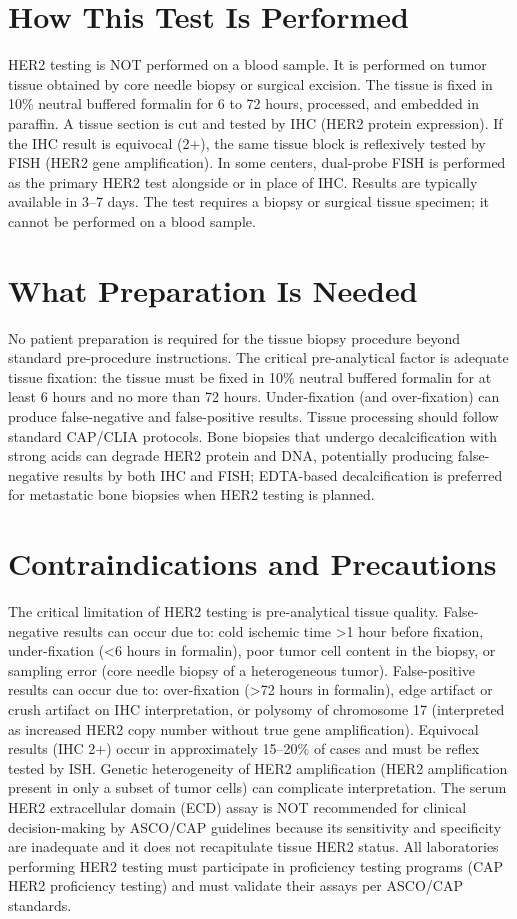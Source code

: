 \section*{How This Test Is Performed}
HER2 testing is NOT performed on a blood sample. It is performed on tumor tissue obtained by core needle biopsy or surgical excision. The tissue is fixed in 10\% neutral buffered formalin for 6 to 72 hours, processed, and embedded in paraffin. A tissue section is cut and tested by IHC (HER2 protein expression). If the IHC result is equivocal (2+), the same tissue block is reflexively tested by FISH (HER2 gene amplification). In some centers, dual-probe FISH is performed as the primary HER2 test alongside or in place of IHC. Results are typically available in 3--7 days. The test requires a biopsy or surgical tissue specimen; it cannot be performed on a blood sample.

\section*{What Preparation Is Needed}
No patient preparation is required for the tissue biopsy procedure beyond standard pre-procedure instructions. The critical pre-analytical factor is adequate tissue fixation: the tissue must be fixed in 10\% neutral buffered formalin for at least 6 hours and no more than 72 hours. Under-fixation (and over-fixation) can produce false-negative and false-positive results. Tissue processing should follow standard CAP/CLIA protocols. Bone biopsies that undergo decalcification with strong acids can degrade HER2 protein and DNA, potentially producing false-negative results by both IHC and FISH; EDTA-based decalcification is preferred for metastatic bone biopsies when HER2 testing is planned.

\section*{Contraindications and Precautions}
The critical limitation of HER2 testing is pre-analytical tissue quality. False-negative results can occur due to: cold ischemic time >1 hour before fixation, under-fixation (<6 hours in formalin), poor tumor cell content in the biopsy, or sampling error (core needle biopsy of a heterogeneous tumor). False-positive results can occur due to: over-fixation (>72 hours in formalin), edge artifact or crush artifact on IHC interpretation, or polysomy of chromosome 17 (interpreted as increased HER2 copy number without true gene amplification). Equivocal results (IHC 2+) occur in approximately 15--20\% of cases and must be reflex tested by ISH. Genetic heterogeneity of HER2 amplification (HER2 amplification present in only a subset of tumor cells) can complicate interpretation. The serum HER2 extracellular domain (ECD) assay is NOT recommended for clinical decision-making by ASCO/CAP guidelines because its sensitivity and specificity are inadequate and it does not recapitulate tissue HER2 status. All laboratories performing HER2 testing must participate in proficiency testing programs (CAP HER2 proficiency testing) and must validate their assays per ASCO/CAP standards.


